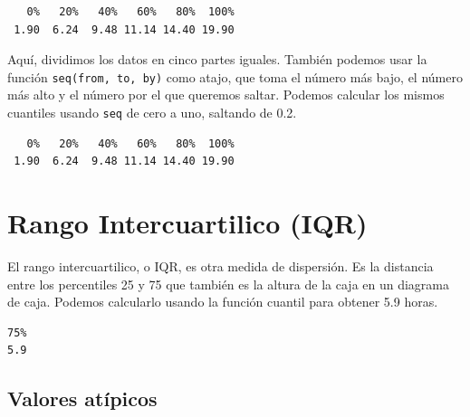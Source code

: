 \documentclass[
  letterpaper,
  DIV=11,
  numbers=noendperiod]{scrreprt}
\newenvironment{Shaded}{\begin{snugshade}}{\end{snugshade}}
\newcommand{\AttributeTok}[1]{\textcolor[rgb]{0.40,0.45,0.13}{#1}}
\newcommand{\DecValTok}[1]{\textcolor[rgb]{0.68,0.00,0.00}{#1}}
\newcommand{\FloatTok}[1]{\textcolor[rgb]{0.68,0.00,0.00}{#1}}
\newcommand{\FunctionTok}[1]{\textcolor[rgb]{0.28,0.35,0.67}{#1}}
\newcommand{\NormalTok}[1]{\textcolor[rgb]{0.00,0.23,0.31}{#1}}
\newcommand{\SpecialCharTok}[1]{\textcolor[rgb]{0.37,0.37,0.37}{#1}}
\begin{document}
\begin{verbatim}
   0%   20%   40%   60%   80%  100% 
 1.90  6.24  9.48 11.14 14.40 19.90 
\end{verbatim}

Aquí, dividimos los datos en cinco partes iguales. También podemos usar
la función \texttt{seq(from,\ to,\ by)} como atajo, que toma el número
más bajo, el número más alto y el número por el que queremos saltar.
Podemos calcular los mismos cuantiles usando \texttt{seq} de cero a uno,
saltando de 0.2.

\begin{Shaded}
\end{Shaded}

\begin{verbatim}
   0%   20%   40%   60%   80%  100% 
 1.90  6.24  9.48 11.14 14.40 19.90 
\end{verbatim}

\hypertarget{rango-intercuartilico-iqr}{%
\section{Rango Intercuartilico (IQR)}\label{rango-intercuartilico-iqr}}

El rango intercuartilico, o IQR, es otra medida de dispersión. Es la
distancia entre los percentiles 25 y 75 que también es la altura de la
caja en un diagrama de caja. Podemos calcularlo usando la función
cuantil para obtener 5.9 horas.

\begin{Shaded}
\end{Shaded}

\begin{verbatim}
75% 
5.9 
\end{verbatim}

\hypertarget{valores-atuxedpicos}{%
\subsection{Valores atípicos}\label{valores-atuxedpicos}}
\end{document}
